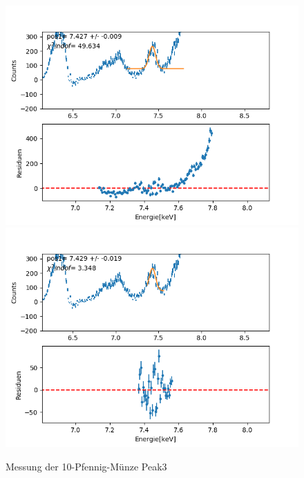 \documentclass[12pt,a4paper]{article}
\begin{document}
\begin{figure}[H]
\centering
\includegraphics[scale=0.49]{Bilder/roentgen_spektren/pfennig/pfen3_1.png}
\includegraphics[scale=0.49]{Bilder/roentgen_spektren/pfennig/pfen3_2.png}
\caption{Messung der 10-Pfennig-Münze Peak3}
\end{figure}
\end{document}
